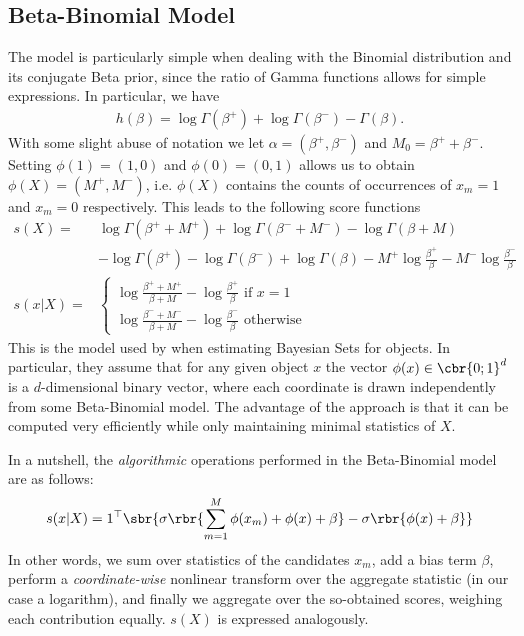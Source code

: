 \documentclass{article}
\begin{document}
\subsection{Beta-Binomial Model}
\label{sec:bb}
The model is particularly simple when dealing with the Binomial distribution and its conjugate Beta prior, since the ratio of Gamma functions allows for simple expressions. In particular, we have 
\begin{align}
  h(\beta) = \log \Gamma(\beta^+) + \log \Gamma(\beta^-) - \Gamma(\beta).
\end{align}
With some slight abuse of notation we let $\alpha = (\beta^+, \beta^-)$ and $M_0 = \beta^+ + \beta^-$. Setting $\phi(1) = (1,0)$ and $\phi(0) = (0,1)$ allows us to obtain $\phi(X) = (M^+, M^-)$, i.e. $\phi(X)$ contains the counts of occurrences of $x_m = 1$ and $x_m = 0$ respectively. This leads to the following score functions 
\begin{align}
  s(X) =& \log \Gamma(\beta^+ + M^+) + \log \Gamma(\beta^- + M^-) - 
         \log \Gamma(\beta + M)  \\
  \nonumber
  & - \log \Gamma(\beta^+) - \log \Gamma(\beta^-) + \log
    \Gamma(\beta) - M^+ \log \frac{\beta^+}{\beta} - M^- \log
    \frac{\beta^-}{\beta} \\
  s(x|X) = &
             \begin{cases}
               \log \frac{\beta^+ + M^+}{\beta + M} - 
               \log \frac{\beta^+}{\beta}
               \text{ if } x = 1 \\
               \log \frac{\beta^- + M^-}{\beta + M} - 
               \log \frac{\beta^-}{\beta}
               \text{ otherwise }
             \end{cases}
\end{align}
This is the model used by \cite{ghahramani2005bayesian} when estimating Bayesian Sets for objects. In particular, they assume that for any given object $x$ the vector $\phi(x) \in \cbr{0; 1}^d$ is a $d$-dimensional binary vector, where each coordinate is drawn independently from some Beta-Binomial model. The advantage of the approach is that it can be computed very efficiently while only maintaining minimal statistics of $X$.

In a nutshell, the \emph{algorithmic} operations performed in the Beta-Binomial model are as follows:
\begin{align}
  \label{eq:nutshell-bb}
  s(x|X) = 1^\top \sbr{
  \sigma\rbr{\sum_{m=1}^M \phi(x_m) + \phi(x) + \beta} - 
  \sigma\rbr{\phi(x) + \beta}}
\end{align}
In other words, we sum over statistics of the candidates $x_m$, add a bias term $\beta$, perform a \emph{coordinate-wise} nonlinear transform over the aggregate statistic (in our case a logarithm), and finally we aggregate over the so-obtained scores, weighing each contribution equally. $s(X)$ is expressed analogously. 
\end{document}
